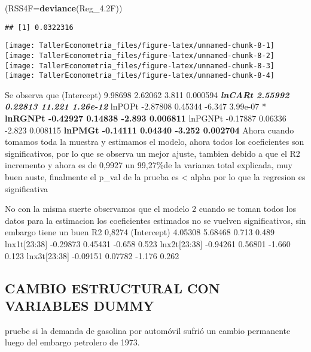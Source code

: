 \documentclass[
]{article}
\newenvironment{Shaded}{\begin{snugshade}}{\end{snugshade}}
\newcommand{\DataTypeTok}[1]{\textcolor[rgb]{0.13,0.29,0.53}{#1}}
\newcommand{\FloatTok}[1]{\textcolor[rgb]{0.00,0.00,0.81}{#1}}
\newcommand{\KeywordTok}[1]{\textcolor[rgb]{0.13,0.29,0.53}{\textbf{#1}}}
\newcommand{\NormalTok}[1]{#1}
\begin{document}
\begin{Shaded}
\begin{Highlighting}[]
\NormalTok{(}\DataTypeTok{RSS4F=}\KeywordTok{deviance}\NormalTok{(Reg_}\FloatTok{4.2}\NormalTok{F))}
\end{Highlighting}
\end{Shaded}

\begin{verbatim}
## [1] 0.0322316
\end{verbatim}

\begin{center}\texttt{[image: TallerEconometria\_files/figure-latex/unnamed-chunk-8-1]} \texttt{[image: TallerEconometria\_files/figure-latex/unnamed-chunk-8-2]} \texttt{[image: TallerEconometria\_files/figure-latex/unnamed-chunk-8-3]} \texttt{[image: TallerEconometria\_files/figure-latex/unnamed-chunk-8-4]} \end{center}

Se observa que (Intercept) 9.98698 2.62062 3.811 0.000594 \textbf{\emph{
lnCARt 2.55992 0.22813 11.221 1.26e-12 }} lnPOPt -2.87808 0.45344 -6.347
3.99e-07 *\textbf{ lnRGNPt -0.42927 0.14838 -2.893 0.006811 } lnPGNPt
-0.17887 0.06336 -2.823 0.008115 \textbf{ lnPMGt -0.14111 0.04340 -3.252
0.002704 } Ahora cuando tomamos toda la muestra y estimamos el modelo,
ahora todos los coeficientes son significativos, por lo que se observa
un mejor ajuste, tambien debido a que el R2 incremento y ahora es de
0,9927 un 99,27\%de la varianza total explicada, muy buen auste,
finalmente el p\_val de la prueba es \textless{} alpha por lo que la
regresion es significativa

No con la misma suerte observamos que el modelo 2 cuando se toman todos
los datos para la estimacion los coeficientes estimados no se vuelven
significativos, sin embargo tiene un buen R2 0,8274 (Intercept) 4.05308
5.68468 0.713 0.489 lnx1t{[}23:38{]} -0.29873 0.45431 -0.658 0.523
lnx2t{[}23:38{]} -0.94261 0.56801 -1.660 0.123 lnx3t{[}23:38{]} -0.09151
0.07782 -1.176 0.262

\hypertarget{cambio-estructural-con-variables-dummy}{%
\subsection{CAMBIO ESTRUCTURAL CON VARIABLES
DUMMY}\label{cambio-estructural-con-variables-dummy}}

pruebe si la demanda de gasolina por automóvil sufrió un cambio
permanente luego del embargo petrolero de 1973.
\end{document}
